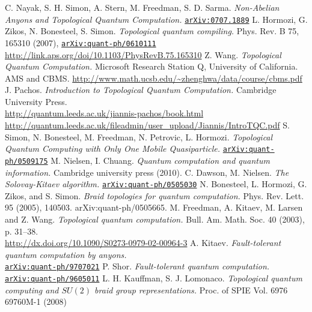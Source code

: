 \documentclass[a4paper,10pt,oneside]{book}
\theoremstyle{plain}
\theoremstyle{definition}
\theoremstyle{remark}
\begin{document}
\begin{thebibliography}{99}
   C. Nayak, S. H. Simon, A. Stern, M. Freedman, S. D. Sarma. \textit{Non-Abelian Anyons and Topological Quantum Computation.} \href{https://arxiv.org/pdf/0707.1889.pdf}{\texttt{arXiv:0707.1889}}
   L. Hormozi, G. Zikos, N. Bonesteel, S. Simon. \textit{Topological quantum compiling.} Phys. Rev. B 75, 165310 (2007), \href{https://arxiv.org/abs/quant-ph/0610111}{\texttt{arXiv:quant-ph/0610111}} \\ \url{http://link.aps.org/doi/10.1103/PhysRevB.75.165310}
   Z. Wang. \textit{Topological Quantum Computation.} Microsoft Research Station Q, University of California. AMS and CBMS. \url{http://www.math.ucsb.edu/~zhenghwa/data/course/cbms.pdf}
   J. Pachos. \textit{Introduction to Topological Quantum Computation.} Cambridge University Press. \\ \url{http://quantum.leeds.ac.uk/jiannis-pachos/book.html} \\ \url{http://quantum.leeds.ac.uk/fileadmin/user_upload/Jiannis/IntroTQC.pdf}
   S. Simon, N. Bonesteel, M. Freedman, N. Petrovic, L. Hormozi. \textit{Topological Quantum Computing with Only One Mobile Quasiparticle.} \href{https://arxiv.org/abs/quant-ph/0509175}{\texttt{arXiv:quant-ph/0509175}}
   M. Nielsen, I. Chuang. \textit{Quantum computation and quantum information.} Cambridge university press (2010).
   C. Dawson, M. Nielsen. \textit{The Solovay-Kitaev algorithm.} \href{https://arxiv.org/abs/quant-ph/0505030}{\texttt{arXiv:quant-ph/0505030}}
   N. Bonesteel, L. Hormozi, G. Zikos, and S. Simon. \textit{Braid topologies for quantum computation.} Phys. Rev. Lett. 95 (2005), 140503. arXiv:quant-ph/0505665.
   M. Freedman, A. Kitaev, M. Larsen and Z. Wang. \textit{Topological quantum computation.} Bull. Am. Math. Soc. 40 (2003), p. 31–38. \\ \url{http://dx.doi.org/10.1090/S0273-0979-02-00964-3}
   A. Kitaev. \textit{Fault-tolerant quantum computation by anyons.} \\ \href{https://arxiv.org/abs/quant-ph/9707021}{\texttt{arXiv:quant-ph/9707021}}
   P. Shor. \textit{Fault-tolerant quantum computation.} \href{https://arxiv.org/abs/quant-ph/9605011}{\texttt{arXiv:quant-ph/9605011}}
   L. H. Kauffman, S. J. Lomonaco. \textit{Topological quantum computing and $SU(2)$ braid group representations.} Proc. of SPIE Vol. 6976  69760M-1 (2008)


\end{thebibliography}
\end{document}
